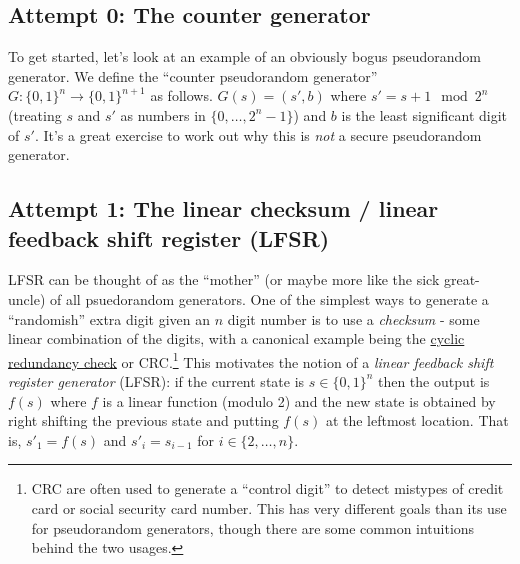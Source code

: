 \subsection{Attempt 0: The counter
generator}\label{3-Attempt--The-counter-g}

To get started, let's look at an example of an obviously bogus
pseudorandom generator. We define the ``counter pseudorandom generator''
\(G:\{0,1\}^n \rightarrow \{0,1\}^{n+1}\) as follows. \(G(s)=(s',b)\)
where \(s' = s + 1 \mod 2^n\) (treating \(s\) and \(s'\) as numbers in
\(\{0,\ldots,2^n-1\}\)) and \(b\) is the least significant digit of
\(s'\). It's a great exercise to work out why this is \emph{not} a
secure pseudorandom generator.


\subsection{Attempt 1: The linear checksum / linear feedback shift
register (LFSR)}\label{3-Attempt--The-linear-ch}

LFSR can be thought of as the ``mother'' (or maybe more like the sick
great-uncle) of all psuedorandom generators. One of the simplest ways to
generate a ``randomish'' extra digit given an \(n\) digit number is to
use a \emph{checksum} - some linear combination of the digits, with a
canonical example being the
\href{https://en.wikipedia.org/wiki/Cyclic_redundancy_check}{cyclic
redundancy check} or CRC.\footnote{CRC are often used to generate a
  ``control digit'' to detect mistypes of credit card or social security
  card number. This has very different goals than its use for
  pseudorandom generators, though there are some common intuitions
  behind the two usages.} This motivates the notion of a \emph{linear
feedback shift register generator} (LFSR): if the current state is
\(s\in\{0,1\}^n\) then the output is \(f(s)\) where \(f\) is a linear
function (modulo 2) and the new state is obtained by right shifting the
previous state and putting \(f(s)\) at the leftmost location. That is,
\(s'_1 = f(s)\) and \(s'_i = s_{i-1}\) for \(i\in\{2,\ldots,n\}\).

